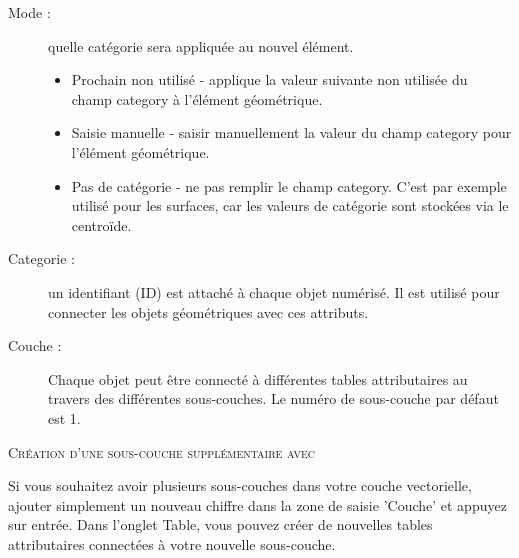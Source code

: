 {\begin{description}
\item[Mode :]quelle catégorie sera appliquée au nouvel élément.
\begin{itemize}[label=--]
  \item Prochain non utilisé - applique la valeur suivante non utilisée du champ category à l'élément géométrique.
  \item Saisie manuelle - saisir manuellement la valeur du champ category pour l'élément géométrique.
  \item Pas de catégorie - ne pas remplir le champ category. C'est par exemple utilisé pour les surfaces, car les valeurs de catégorie sont stockées via le centroïde.
\end{itemize}
\item[Categorie :]un identifiant (ID) est attaché à chaque objet numérisé. Il est utilisé pour connecter les objets géométriques avec ces attributs.
\item[Couche :]Chaque objet peut être connecté à différentes tables attributaires au travers des différentes sous-couches. Le numéro de sous-couche par défaut est 1.
\end{description}

\begin{Tip}\caption{\textsc{Création d'une sous-couche supplémentaire avec \qg}}
Si vous souhaitez avoir plusieurs sous-couches dans votre couche vectorielle, ajouter simplement un nouveau chiffre dans la zone de saisie 'Couche' et appuyez sur entrée. Dans l'onglet Table, vous pouvez créer de nouvelles tables attributaires connectées à votre nouvelle sous-couche.
\end{Tip}

}
